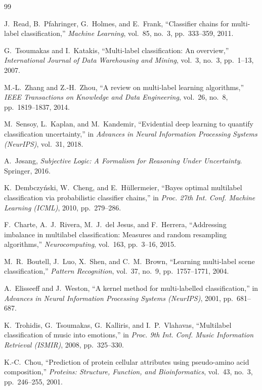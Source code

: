 \documentclass[conference]{IEEEtran}
\begin{document}
\begin{thebibliography}{99}

J.~Read, B.~Pfahringer, G.~Holmes, and E.~Frank, ``Classifier chains for multi-label classification,'' \emph{Machine Learning}, vol.~85, no.~3, pp.~333--359, 2011.

G.~Tsoumakas and I.~Katakis, ``Multi-label classification: An overview,'' \emph{International Journal of Data Warehousing and Mining}, vol.~3, no.~3, pp.~1--13, 2007.

M.-L.~Zhang and Z.-H.~Zhou, ``A review on multi-label learning algorithms,'' \emph{IEEE Transactions on Knowledge and Data Engineering}, vol.~26, no.~8, pp.~1819--1837, 2014.

M.~Sensoy, L.~Kaplan, and M.~Kandemir, ``Evidential deep learning to quantify classification uncertainty,'' in \emph{Advances in Neural Information Processing Systems (NeurIPS)}, vol.~31, 2018.

A.~J{\o}sang, \emph{Subjective Logic: A Formalism for Reasoning Under Uncertainty}. Springer, 2016.

K.~Dembczy{\'n}ski, W.~Cheng, and E.~H{\"u}llermeier, ``Bayes optimal multilabel classification via probabilistic classifier chains,'' in \emph{Proc. 27th Int. Conf. Machine Learning (ICML)}, 2010, pp.~279--286.

F.~Charte, A.~J.~Rivera, M.~J.~del Jesus, and F.~Herrera, ``Addressing imbalance in multilabel classification: Measures and random resampling algorithms,'' \emph{Neurocomputing}, vol.~163, pp.~3--16, 2015.

M.~R.~Boutell, J.~Luo, X.~Shen, and C.~M.~Brown, ``Learning multi-label scene classification,'' \emph{Pattern Recognition}, vol.~37, no.~9, pp.~1757--1771, 2004.

A.~Elisseeff and J.~Weston, ``A kernel method for multi-labelled classification,'' in \emph{Advances in Neural Information Processing Systems (NeurIPS)}, 2001, pp.~681--687.

K.~Trohidis, G.~Tsoumakas, G.~Kalliris, and I.~P.~Vlahavas, ``Multilabel classification of music into emotions,'' in \emph{Proc. 9th Int. Conf. Music Information Retrieval (ISMIR)}, 2008, pp.~325--330.

K.-C.~Chou, ``Prediction of protein cellular attributes using pseudo-amino acid composition,'' \emph{Proteins: Structure, Function, and Bioinformatics}, vol.~43, no.~3, pp.~246--255, 2001.


\end{thebibliography}
\end{document}
